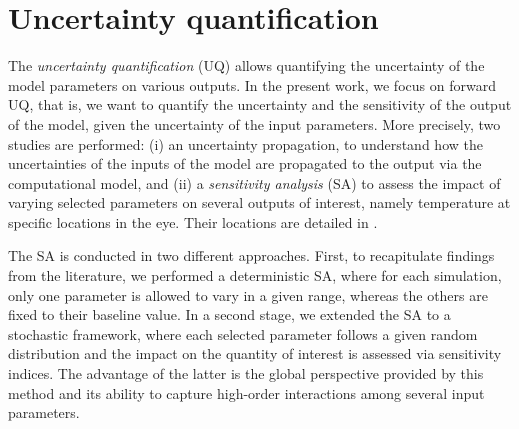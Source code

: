 \section{Uncertainty quantification}
\label{sec:uq}


The \emph{uncertainty quantification} (UQ) allows quantifying the uncertainty of the model parameters on various outputs.
In the present work, we focus on forward UQ, that is, we want to quantify the uncertainty and the sensitivity of the output of the model, given the uncertainty of the input parameters.
More precisely, two studies are performed:
(i) an uncertainty propagation, to understand how the uncertainties of the inputs of the model are propagated to the output via the computational model, and
(ii) a \emph{sensitivity analysis} (SA) to assess the impact of varying selected parameters on several outputs of interest, namely temperature at specific locations in the eye.
Their locations are detailed in .

The SA is conducted in two different approaches.
First, to recapitulate findings from the literature, we performed a deterministic SA, where for each simulation,
only one parameter is allowed to vary in a given range, whereas the others are fixed to their baseline value.
In a second stage, we extended the SA to a stochastic framework, where each selected parameter follows a given random distribution
and the impact on the quantity of interest is assessed via sensitivity indices.
The advantage of the latter is the global perspective provided by this method and its ability to capture high-order interactions among several input parameters.





